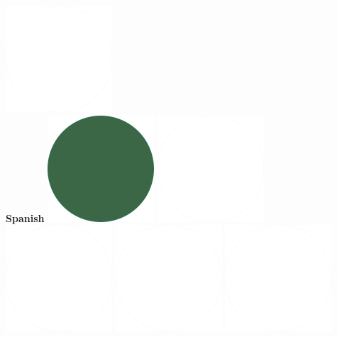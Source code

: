 \documentclass[]{friggeri-cv_reccius-experiment}
\begin{document}
\begin{below1}
    \includegraphics[scale=0.11]{img/WhiteDots.png}\\
    \belowspace
    \textbf{Spanish}\hfill
    \includegraphics[scale=0.11]{img/IPSGreenDots.png}
    \includegraphics[scale=0.11]{img/WhiteDots.png}
    \includegraphics[scale=0.11]{img/WhiteDots.png}
    \includegraphics[scale=0.11]{img/WhiteDots.png}
    \includegraphics[scale=0.11]{img/WhiteDots.png}

\end{below1}
\end{document}

